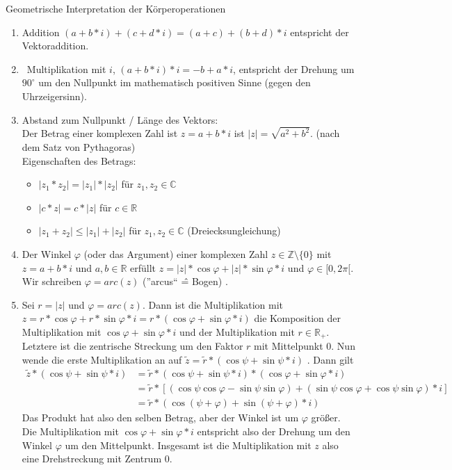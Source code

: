 Geometrische Interpretation der Körperoperationen
\begin{enumerate}
\item Addition $(a+b*i) + (c+d*i) = (a+c) + (b+d) * i$ entspricht der Vektoraddition. 
\item Multiplikation mit $i$, $(a+b*i) * i = -b + a * i$, entspricht der Drehung um $90 ^\circ$ um den Nullpunkt im mathematisch positiven Sinne (gegen den Uhrzeigersinn). 
\item Abstand zum Nullpunkt / Länge des Vektors:\\
	Der Betrag einer komplexen Zahl ist $z = a + b * i$ ist $|z| = \sqrt{a^2 + b^2}$. (nach dem Satz von Pythagoras) \\
	Eigenschaften des Betrags:
	\begin{itemize}
	\item $|z_1 * z_2| = |z_1| * |z_2|$ für $z_1, z_2 \in \mathbb{C}$
	\item $|c * z| = c * |z|$ für $c \in \mathbb{R}$
	\item $|z_1 + z_2| \leq |z_1| + |z_2|$ für $z_1, z_2 \in \mathbb{C}$ (Dreiecksungleichung)
	\end{itemize}
\item Der Winkel $\varphi$ (oder das Argument) einer komplexen Zahl $z \in \mathbb{Z} \setminus \{0\}$ mit $z = a+b*i$ und $a,b \in \mathbb{R}$ erfüllt $z = |z| * \cos{\varphi} + |z| * \sin{\varphi} * i$ und $\varphi \in [0, 2 \pi[$.
	Wir schreiben $\varphi = arc (z)$ (''arcus`` \^= Bogen) . 
\item Sei $r=|z|$ und $\varphi = arc(z)$.
	Dann ist die Multiplikation mit $z = r * \cos{\varphi} + r * \sin{\varphi} * i = r * (\cos{\varphi} + \sin{\varphi} * i)$ die Komposition der Multiplikation mit $\cos{\varphi} + \sin{\varphi} * i$ und der Multiplikation mit $r \in \mathbb{R}_+$.
	Letztere ist die zentrische Streckung um den Faktor $r$ mit Mittelpunkt 0.
	Nun wende die erste Multiplikation an auf $\tilde{z} = \tilde{r} * (\cos{\psi} + \sin{\psi} * i)$ .
	Dann gilt
	\begin{align*}
	\tilde{z} * (\cos{\psi} + \sin{\psi} * i) &=
	\tilde{r} * (\cos{\psi} + \sin{\psi} * i) * (\cos{\varphi} + \sin{\varphi} * i) \\ &=
	\tilde{r} * \left[ (\cos{\psi}\cos{\varphi} - \sin{\psi}\sin{\varphi}) + (\sin{\psi}\cos{\varphi} + \cos{\psi}\sin{\varphi}) * i \right] \\ &=
	\tilde{r} * (\cos{(\psi + \varphi)} + \sin{(\psi + \varphi)} * i)
	\end{align*}
	Das Produkt hat also den selben Betrag, aber der Winkel ist um $\varphi$ größer.
	Die Multiplikation mit $\cos{\varphi} + \sin{\varphi} * i$ entspricht also der Drehung um den Winkel $\varphi$ um den Mittelpunkt.
	Insgesamt ist die Multiplikation mit $z$ also eine Drehstreckung mit Zentrum 0.
\end{enumerate}

